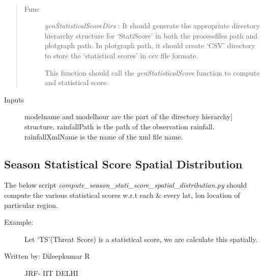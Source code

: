 \documentclass[letterpaper,10pt,english]{sphinxmanual}
\begin{document}

\begin{fulllineitems}
\label{diagnosis:compute_region_statistical_score.genStatisticalScoreDirs}~\begin{quote}\begin{description}
\item[{Func }] \leavevmode
\emph{genStatisticalScoreDirs} : It should generate the appropriate
directory hierarchy structure for `StatiScore' in both the processfiles
path and plotgraph path. In plotgraph path, it should create `CSV'
directory to store the `statistical scores' in csv file formate.

This function should call the \emph{genStatisticalScore} function to
compute and statistical score.

\end{description}\end{quote}
\begin{description}
\item[{Inputs}] \leavevmode{[}modelname and modelhour are the part of the directory hierarchy{]}
structure.
rainfallPath is the path of the observation rainfall.
rainfallXmlName is the name of the xml file name.

\end{description}

\end{fulllineitems}



\subsection{Season Statistical Score Spatial Distribution}
\label{diagnosis:season-statistical-score-spatial-distribution}
The below script \emph{compute\_season\_stati\_score\_spatial\_distribution.py} should compute the various statistical scores w.r.t each \& every lat, lon
location of particular region.
\label{diagnosis:module-compute_season_stati_score_spatial_distribution}\label{diagnosis:module-compute_season_stati_score_spatial_distribution.py}\begin{description}
\item[{Example:}] \leavevmode
Let `TS'(Threat Score) is a statistical score,
we are calculate this spatially.

\item[{Written by: Dileepkumar R}] \leavevmode
JRF- IIT DELHI

\end{description}
\end{document}
